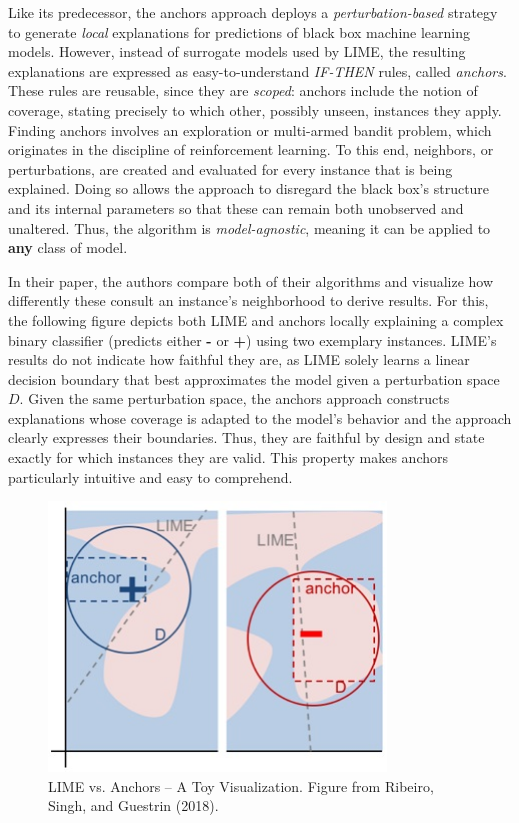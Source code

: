\documentclass[
  11pt,
]{scrbook}
\begin{document}
Like its predecessor, the anchors approach deploys a \emph{perturbation-based} strategy to generate \emph{local} explanations for predictions of black box machine learning models.
However, instead of surrogate models used by LIME, the resulting explanations are expressed as easy-to-understand \emph{IF-THEN} rules, called \emph{anchors}.
These rules are reusable, since they are \emph{scoped}:
anchors include the notion of coverage, stating precisely to which other, possibly unseen, instances they apply.
Finding anchors involves an exploration or multi-armed bandit problem, which originates in the discipline of reinforcement learning.
To this end, neighbors, or perturbations, are created and evaluated for every instance that is being explained.
Doing so allows the approach to disregard the black box's structure and its internal parameters so that these can remain both unobserved and unaltered.
Thus, the algorithm is \emph{model-agnostic}, meaning it can be applied to \textbf{any} class of model.

In their paper, the authors compare both of their algorithms and visualize how differently these consult an instance's neighborhood to derive results.
For this, the following figure depicts both LIME and anchors locally explaining a complex binary classifier (predicts either \textbf{-} or \textbf{+}) using two exemplary instances.
LIME's results do not indicate how faithful they are, as LIME solely learns a linear decision boundary that best approximates the model given a perturbation space \(D\).
Given the same perturbation space, the anchors approach constructs explanations whose coverage is adapted to the model's behavior and the approach clearly expresses their boundaries.
Thus, they are faithful by design and state exactly for which instances they are valid.
This property makes anchors particularly intuitive and easy to comprehend.

\begin{figure}

{\centering \includegraphics[width=0.8\textwidth]{images/anchors-visualization} 

}

\caption{LIME vs. Anchors -- A Toy Visualization. Figure from Ribeiro, Singh, and Guestrin (2018).}\label{fig:unnamed-chunk-29}
\end{figure}
\end{document}
